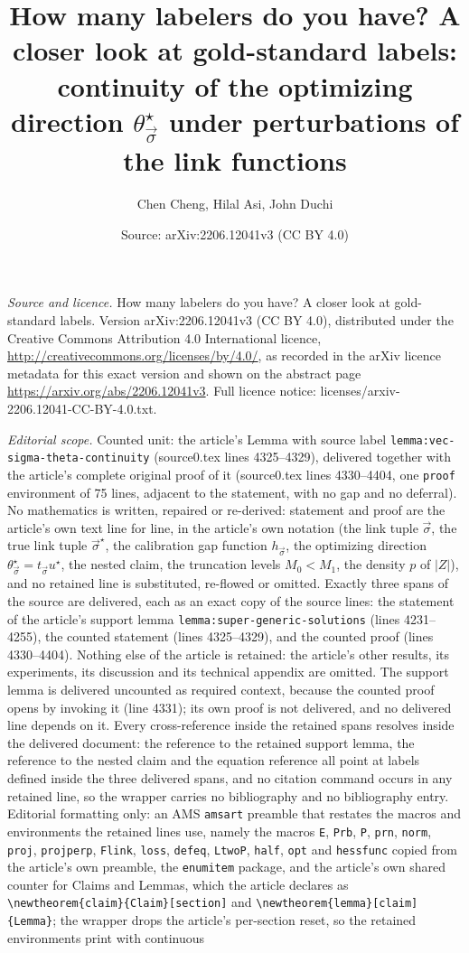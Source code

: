 \documentclass[10pt,a4paper]{amsart}
\title[Continuity of the optimizing direction in a semiparametric majority-vote M-estimator]{How many labelers do you have? A closer look at gold-standard labels: continuity of the optimizing direction $\theta^\star_{\vec{\sigma}}$ under perturbations of the link functions}
\author{Chen Cheng, Hilal Asi, John Duchi}
\date{Source: arXiv:2206.12041v3 (CC BY 4.0)}
\theoremstyle{plain}
\begin{document}
\maketitle
\noindent\emph{Source and licence.} How many labelers do you have? A closer look at gold-standard labels. Version arXiv:2206.12041v3 (CC BY 4.0), distributed under the Creative Commons Attribution 4.0 International licence, \url{http://creativecommons.org/licenses/by/4.0/}, as recorded in the arXiv licence metadata for this exact version and shown on the abstract page \url{https://arxiv.org/abs/2206.12041v3}. Full licence notice: licenses/arxiv-2206.12041-CC-BY-4.0.txt.\par\smallskip

\noindent\textit{Editorial scope.} Counted unit: the article's Lemma with source label \texttt{lemma:vec-sigma-theta-continuity} (source0.tex lines 4325--4329), delivered together with the article's complete original proof of it (source0.tex lines 4330--4404, one \texttt{proof} environment of 75 lines, adjacent to the statement, with no gap and no deferral). No mathematics is written, repaired or re-derived: statement and proof are the article's own text line for line, in the article's own notation (the link tuple $\vec{\sigma}$, the true link tuple $\vec{\sigma}^\star$, the calibration gap function $h_{\vec{\sigma}}$, the optimizing direction $\theta^\star_{\vec{\sigma}} = t_{\vec{\sigma}} u^\star$, the nested claim, the truncation levels $M_0 < M_1$, the density $p$ of $|Z|$), and no retained line is substituted, re-flowed or omitted. Exactly three spans of the source are delivered, each as an exact copy of the source lines: the statement of the article's support lemma \texttt{lemma:super-generic-solutions} (lines 4231--4255), the counted statement (lines 4325--4329), and the counted proof (lines 4330--4404). Nothing else of the article is retained: the article's other results, its experiments, its discussion and its technical appendix are omitted. The support lemma is delivered uncounted as required context, because the counted proof opens by invoking it (line 4331); its own proof is not delivered, and no delivered line depends on it. Every cross-reference inside the retained spans resolves inside the delivered document: the reference to the retained support lemma, the reference to the nested claim and the equation reference all point at labels defined inside the three delivered spans, and no citation command occurs in any retained line, so the wrapper carries no bibliography and no bibliography entry. Editorial formatting only: an AMS \texttt{amsart} preamble that restates the macros and environments the retained lines use, namely the macros \texttt{E}, \texttt{Prb}, \texttt{P}, \texttt{prn}, \texttt{norm}, \texttt{proj}, \texttt{projperp}, \texttt{Flink}, \texttt{loss}, \texttt{defeq}, \texttt{LtwoP}, \texttt{half}, \texttt{opt} and \texttt{hessfunc} copied from the article's own preamble, the \texttt{enumitem} package, and the article's own shared counter for Claims and Lemmas, which the article declares as \texttt{\textbackslash newtheorem\{claim\}\{Claim\}[section]} and \texttt{\textbackslash newtheorem\{lemma\}[claim]\{Lemma\}}; the wrapper drops the article's per-section reset, so the retained environments print with continuous 
\end{document}
